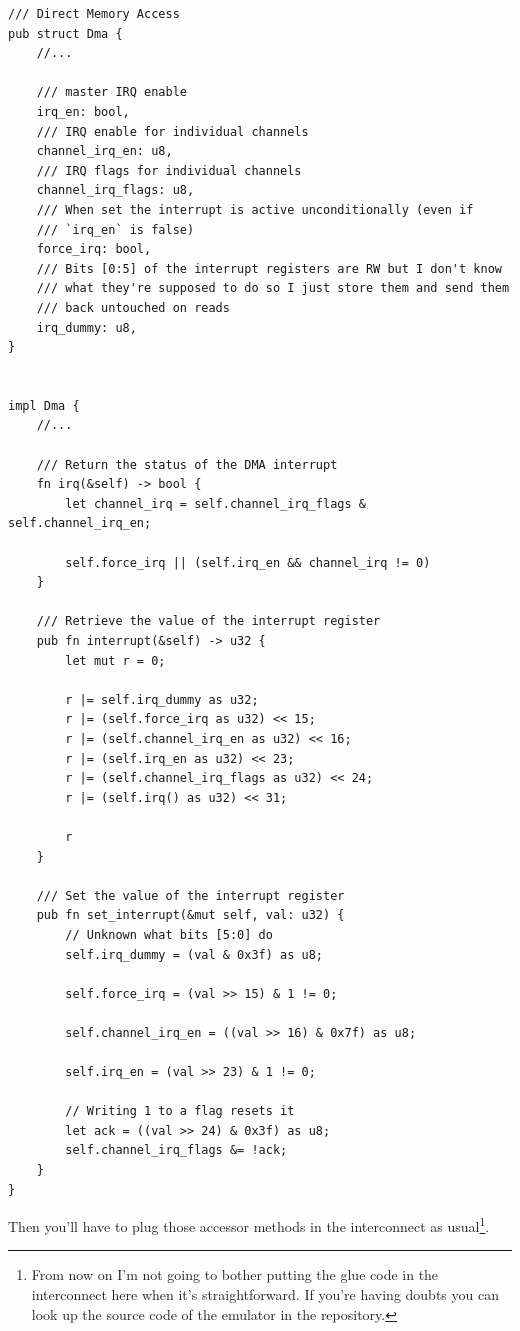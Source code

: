 \documentclass[a4paper]{article}
\begin{document}
\begin{lstlisting}
/// Direct Memory Access
pub struct Dma {
    //...

    /// master IRQ enable
    irq_en: bool,
    /// IRQ enable for individual channels
    channel_irq_en: u8,
    /// IRQ flags for individual channels
    channel_irq_flags: u8,
    /// When set the interrupt is active unconditionally (even if
    /// `irq_en` is false)
    force_irq: bool,
    /// Bits [0:5] of the interrupt registers are RW but I don't know
    /// what they're supposed to do so I just store them and send them
    /// back untouched on reads
    irq_dummy: u8,
}


impl Dma {
    //...

    /// Return the status of the DMA interrupt
    fn irq(&self) -> bool {
        let channel_irq = self.channel_irq_flags & self.channel_irq_en;

        self.force_irq || (self.irq_en && channel_irq != 0)
    }

    /// Retrieve the value of the interrupt register
    pub fn interrupt(&self) -> u32 {
        let mut r = 0;

        r |= self.irq_dummy as u32;
        r |= (self.force_irq as u32) << 15;
        r |= (self.channel_irq_en as u32) << 16;
        r |= (self.irq_en as u32) << 23;
        r |= (self.channel_irq_flags as u32) << 24;
        r |= (self.irq() as u32) << 31;

        r
    }

    /// Set the value of the interrupt register
    pub fn set_interrupt(&mut self, val: u32) {
        // Unknown what bits [5:0] do
        self.irq_dummy = (val & 0x3f) as u8;

        self.force_irq = (val >> 15) & 1 != 0;

        self.channel_irq_en = ((val >> 16) & 0x7f) as u8;

        self.irq_en = (val >> 23) & 1 != 0;

        // Writing 1 to a flag resets it
        let ack = ((val >> 24) & 0x3f) as u8;
        self.channel_irq_flags &= !ack;
    }
}
\end{lstlisting}

Then you'll have to plug those accessor methods in the interconnect as
usual\footnote{From now on I'm not going to bother putting the glue
  code in the interconnect here when it's straightforward. If you're
  having doubts you can look up the source code of the emulator in the
  repository.}.
\end{document}
